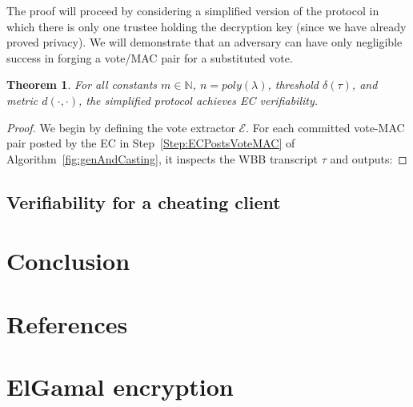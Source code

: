 \documentclass[12pt,a4paper]{article}
\newtheorem{theorem}{Theorem}
\theoremstyle{definition}
\begin{document}
The proof will proceed by considering a simplified version of the protocol in which there is only one trustee holding the decryption key (since we have already proved privacy). We will demonstrate that an adversary can have only negligible success in forging a vote/MAC pair for a substituted vote.

\begin{theorem}
    For all constants $m\in\mathbb{N}$, $n=poly(\lambda)$, threshold $\delta(\tau)$, and metric $d(\cdot, \cdot)$, the simplified protocol achieves EC verifiability.
\end{theorem}
\begin{proof}
    We begin by defining the vote extractor $\mathcal{E}$. For each committed vote-MAC pair posted by the EC in Step~\ref{Step:ECPostsVoteMAC} of Algorithm~\ref{fig:genAndCasting}, it inspects the WBB transcript $\tau$ and outputs:
\end{proof}
\subsection{Verifiability for a cheating client}
\section{Conclusion}
\newpage
\section{References}


\newpage
\appendix
\section{ElGamal encryption}\label{app-elgamal}
\end{document}
